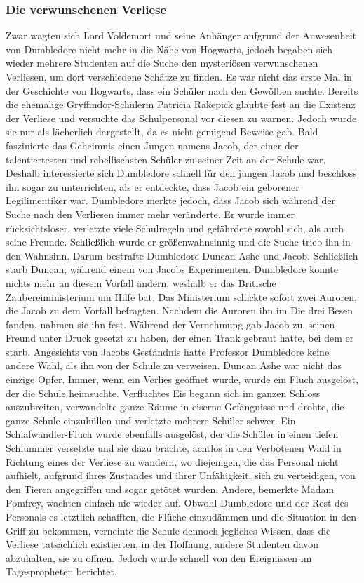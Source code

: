 \documentclass[a4paper, 10pt]{article}
\begin{document}
\subsubsection*{Die verwunschenen Verliese}
Zwar wagten sich Lord Voldemort und seine Anhänger aufgrund der Anwesenheit von Dumbledore nicht mehr in die Nähe von Hogwarts, jedoch begaben sich wieder mehrere Studenten auf die Suche den mysteriösen verwunschenen Verliesen, um dort verschiedene Schätze zu finden. Es war nicht das erste Mal in der Geschichte von Hogwarts, dass ein Schüler nach den Gewölben suchte. Bereits die ehemalige Gryffindor-Schülerin Patricia Rakepick glaubte fest an die Existenz der Verliese und versuchte das Schulpersonal vor diesen zu warnen. Jedoch wurde sie nur als lächerlich dargestellt, da es nicht genügend Beweise gab. Bald faszinierte das Geheimnis einen Jungen namens Jacob, der einer der talentiertesten und rebellischsten Schüler zu seiner Zeit an der Schule war. Deshalb interessierte sich Dumbledore schnell für den jungen Jacob und beschloss ihn sogar zu unterrichten, als er entdeckte, dass Jacob ein geborener Legilimentiker war.
\vspace{10pt}
\newline
Dumbledore merkte jedoch, dass Jacob sich während der Suche nach den Verliesen immer mehr veränderte. Er wurde immer rücksichtsloser, verletzte viele Schulregeln und gefährdete sowohl sich, als auch seine Freunde. Schließlich wurde er größenwahnsinnig und die Suche trieb ihn in den Wahnsinn. Darum bestrafte Dumbledore Duncan Ashe und Jacob. Schließlich starb Duncan, während einem von Jacobs Experimenten. Dumbledore konnte nichts mehr an diesem Vorfall ändern, weshalb er das Britische Zaubereiministerium um Hilfe bat. Das Ministerium schickte sofort zwei Auroren, die Jacob zu dem Vorfall befragten. Nachdem die Auroren ihn im Die drei Besen fanden, nahmen sie ihn fest. Während der Vernehmung gab Jacob zu, seinen Freund unter Druck gesetzt zu haben, der einen Trank gebraut hatte, bei dem er starb. Angesichts von Jacobs Geständnis hatte Professor Dumbledore keine andere Wahl, als ihn von der Schule zu verweisen.
\vspace{10pt}
\newline
Duncan Ashe war nicht das einzige Opfer. Immer, wenn ein Verlies geöffnet wurde, wurde ein Fluch ausgelöst, der die Schule heimsuchte. Verfluchtes Eis begann sich im ganzen Schloss auszubreiten, verwandelte ganze Räume in eiserne Gefängnisse und drohte, die ganze Schule einzuhüllen und verletzte mehrere Schüler schwer. Ein Schlafwandler-Fluch wurde ebenfalls ausgelöst, der die Schüler in einen tiefen Schlummer versetzte und sie dazu brachte, achtlos in den Verbotenen Wald in Richtung eines der Verliese zu wandern, wo diejenigen, die das Personal nicht aufhielt, aufgrund ihres Zustandes und ihrer Unfähigkeit, sich zu verteidigen, von den Tieren angegriffen und sogar getötet wurden. Andere, bemerkte Madam Pomfrey, wachten einfach nie wieder auf. Obwohl Dumbledore und der Rest des Personals es letztlich schafften, die Flüche einzudämmen und die Situation in den Griff zu bekommen, verneinte die Schule dennoch jegliches Wissen, dass die Verliese tatsächlich existierten, in der Hoffnung, andere Studenten davon abzuhalten, sie zu öffnen. Jedoch wurde schnell von den Ereignissen im Tagespropheten berichtet.
\end{document}

